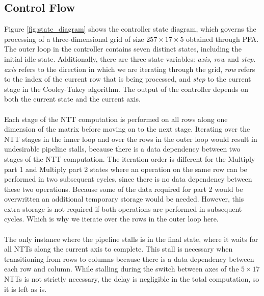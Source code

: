 \documentclass[english,master=eelt,masteroption=ec]{kulemt}
\begin{document}
\subsection{Control Flow}
\label{section:control_flow}
Figure \ref{fig:state_diagram} shows the controller state diagram, which governs the processing of a three-dimensional grid of size $257 \times 17 \times 5$ obtained through PFA. The outer loop in the controller contains seven distinct states, including the initial idle state. Additionally, there are three state variables: \emph{axis}, \emph{row} and \emph{step}. \emph{axis} refers to the direction in which we are iterating through the grid, \emph{row} refers to the index of the current row that is being processed, and \emph{step} to the current stage in the Cooley-Tukey algorithm. The output of the controller depends on both the current state and the current axis.
\\\\
Each stage of the NTT computation is performed on all rows along one dimension of the matrix before moving on to the next stage. Iterating over the NTT stages in the inner loop and over the rows in the outer loop would result in undesirable pipeline stalls, because there is a data dependency between two stages of the NTT computation. The iteration order is different for the Multiply part 1 and Multiply part 2 states where an operation on the same row can be performed in two subsequent cycles, since there is no data dependency between these two operations. Because some of the data required for part 2 would be overwritten an additional temporary storage would be needed. However, this extra storage is not required if both operations are performed in subsequent cycles. Which is why we iterate over the rows in the outer loop here.
\\\\
The only instance where the pipeline stalls is in the final state, where it waits for all NTTs along the current axis to complete. This stall is necessary when transitioning from rows to columns because there is a data dependency between each row and column. While stalling during the switch between axes of the $5 \times 17$ NTTs is not strictly necessary, the delay is negligible in the total computation, so it is left as is.
\end{document}
